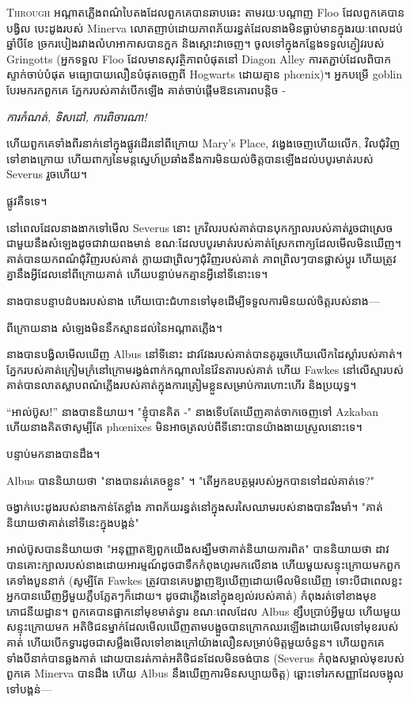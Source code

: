 
\lettrine{T}{hrough} អណ្ដាតភ្លើងពណ៌បៃតងដែលពួកគេបានឆាបឆេះ តាមរយៈបណ្តាញ Floo ដែលពួកគេបានបង្វិល បេះដូងរបស់ Minerva លោតញាប់ដោយភាពភ័យរន្ធត់ដែលនាងមិនធ្លាប់មានក្នុងរយៈពេលដប់ឆ្នាំបីខែ ច្រករបៀងរវាងលំហអាកាសបានក្អក និងស្តោះវាចេញ។ ចូលទៅក្នុងកន្លែងទទួលភ្ញៀវរបស់ Gringotts (អ្នកទទួល Floo ដែលមានសុវត្ថិភាពបំផុតនៅ Diagon Alley ការតភ្ជាប់ដែលពិបាកស្ទាក់ចាប់បំផុត មធ្យោបាយលឿនបំផុតចេញពី Hogwarts ដោយគ្មាន phœnix)។ អ្នកបម្រើ goblin បែរមករកពួកគេ ភ្នែករបស់គាត់បើកឡើង គាត់ចាប់ផ្តើមឱនគោរពបន្តិច -

\emph{ការ​កំណត់, ទិសដៅ, ការ​ពិចារណា!}

ហើយពួកគេទាំងពីរនាក់នៅក្នុងផ្លូវដើរនៅពីក្រោយ Mary's Place, វង្វេងចេញហើយលើក, វិលជុំវិញទៅខាងក្រោយ ហើយពាក្យនៃមន្តស្នេហ៍ប្រឆាំងនឹងការមិនយល់ចិត្តបានឡើងដល់បបូរមាត់របស់ Severus រួចហើយ។

ផ្លូវគឺទទេ។

នៅពេលដែលនាងងាកទៅមើល Severus នោះ ក្រវិលរបស់គាត់បានបុកក្បាលរបស់គាត់រួចជាស្រេចជាមួយនឹងសំឡេងដូចជាវាយពងមាន់ ខណៈដែលបបូរមាត់របស់គាត់ស្រែកពាក្យដែលមើលមិនឃើញ។ គាត់បានយកពណ៌ជុំវិញរបស់គាត់ ក្លាយជាព្រិលៗជុំវិញរបស់គាត់ ភាពព្រិលៗបានផ្លាស់ប្តូរ ហើយត្រូវគ្នានឹងអ្វីដែលនៅពីក្រោយគាត់ ហើយបន្ទាប់មកគ្មានអ្វីនៅទីនោះទេ។

នាង​បាន​បន្ទាប​ដំបង​របស់​នាង ហើយ​បោះ​ជំហាន​ទៅ​មុខ​ដើម្បី​ទទួល​ការ​មិន​យល់​ចិត្ត​របស់​នាង—

ពី​ក្រោយ​នាង សំឡេង​មិន​នឹក​ស្មាន​ដល់​នៃ​អណ្តាត​ភ្លើង។

នាង​បាន​បង្វិល​មើល​ឃើញ Albus នៅ​ទី​នោះ ដាវ​វែង​របស់​គាត់​បាន​គូរ​រួច​ហើយ​លើក​ដៃ​ស្តាំ​របស់​គាត់។ ភ្នែករបស់គាត់ក្រៀមក្រំនៅក្រោមរង្វង់ពាក់កណ្តាលនៃវ៉ែនតារបស់គាត់ ហើយ Fawkes នៅលើស្មារបស់គាត់បានលាតស្លាបពណ៌ភ្លើងរបស់គាត់ក្នុងការត្រៀមខ្លួនសម្រាប់ការហោះហើរ និងប្រយុទ្ធ។

“អាល់ប៊ូស!” នាងបាននិយាយ។ "ខ្ញុំបានគិត -" នាងទើបតែឃើញគាត់ចាកចេញទៅ Azkaban ហើយនាងគិតថាសូម្បីតែ phœnixes មិនអាចត្រលប់ពីទីនោះបានយ៉ាងងាយស្រួលនោះទេ។

បន្ទាប់មកនាងបានដឹង។

Albus បាននិយាយថា "នាងបានរត់គេចខ្លួន" ។ "តើអ្នកឧបត្ថម្ភរបស់អ្នកបានទៅដល់គាត់ទេ?"

ចង្វាក់បេះដូងរបស់នាងកាន់តែខ្លាំង ភាពភ័យរន្ធត់នៅក្នុងសរសៃឈាមរបស់នាងបានរឹងមាំ។ "គាត់និយាយថាគាត់នៅទីនេះក្នុងបង្គន់"

អាល់ប៊ូសបាននិយាយថា "អនុញ្ញាតឱ្យពួកយើងសង្ឃឹមថាគាត់និយាយការពិត" បាននិយាយថា ដាវបានគោះក្បាលរបស់នាងដោយអារម្មណ៍ដូចជាទឹកកំពុងហូរមកលើនាង ហើយមួយសន្ទុះក្រោយមកពួកគេទាំងបួននាក់ (សូម្បីតែ Fawkes ត្រូវបានគេបង្ហាញឱ្យឃើញដោយមើលមិនឃើញ ទោះបីជាពេលខ្លះអ្នកបានឃើញអ្វីមួយភ្លឹបភ្លែតៗក៏ដោយ។ ដូចជាភ្លើងនៅក្នុងខ្យល់របស់គាត់) កំពុងរត់ទៅខាងមុខភោជនីយដ្ឋាន។ ពួកគេបានផ្អាកនៅមុខមាត់ទ្វារ ខណៈពេលដែល Albus ខ្សឹបប្រាប់អ្វីមួយ ហើយមួយសន្ទុះក្រោយមក អតិថិជនម្នាក់ដែលមើលឃើញតាមបង្អួចបានក្រោកឈរឡើងដោយមើលទៅមុខរបស់គាត់ ហើយបើកទ្វារដូចជាសម្លឹងមើលទៅខាងក្រៅយ៉ាងលឿនសម្រាប់មិត្តមួយចំនួន។ ហើយពួកគេទាំងបីនាក់បានឆ្លងកាត់ ដោយបានរត់កាត់អតិថិជនដែលមិនចង់បាន (Severus កំពុងសម្គាល់មុខរបស់ពួកគេ Minerva បានដឹង ហើយ Albus នឹងឃើញការមិនសប្បាយចិត្ត) ឆ្ពោះទៅរកសញ្ញាដែលចង្អុលទៅបង្គន់—

